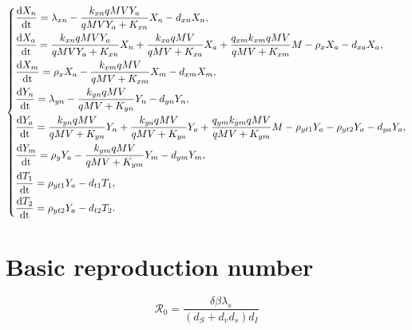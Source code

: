 \documentclass[preprint,11pt,sort&compress,square]{elsarticle}
\numberwithin{equation}{section}
\begin{document}
\begin{equation}\label{cellularimmunity}
	\left\{
	\begin{aligned}
		 & \frac{{\rm d } X_{n}}{{\rm dt}}=\lambda_{xn}-\frac{k_{xn}qMVY_{a}}{qMVY_{a}+K_{xn}}X_{n}-d_{xn}X_{n},                                                                                       \\
		 & \frac{{\rm d } X_{a}}{{\rm dt}}=\frac{k_{xn}qMVY_{a}}{qMVY_{a}+K_{xn}}X_{n}+\frac{k_{xa}qMV}{qMV+K_{xa}}X_{a}+\frac{q_{xm}k_{xm}qMV}{qMV+K_{xm}}M-\rho_{x}X_{a}-d_{xa}X_{a},                    \\
		 & \frac{{\rm d } X_{m}}{{\rm dt}}=\rho_{x} X_{a}-\frac{k_{xm}qMV}{qMV+K_{xm}}X_{m}-d_{xm}X_{m},                                                       \\
		 & \frac{{\rm d } Y_{n}}{{\rm dt}}=\lambda_{yn}-\frac{k_{yn}qMV}{qMV+K_{yn}}Y_{n}-d_{yn}Y_{n},                                                                                       \\
		 & \frac{{\rm d } Y_{a}}{{\rm dt}}=\frac{k_{yn}qMV}{qMV+K_{yn}}Y_{n}+\frac{k_{ya}qMV}{qMV+K_{ya}}Y_{a}+\frac{q_{ym}k_{ym}qMV}{qMV+K_{ym}}M-\rho_{yt1}Y_{a}-\rho_{yt2}Y_{a}-d_{ya}Y_{a}, \\
		 & \frac{{\rm d } Y_{m}}{{\rm dt}}=\rho_{y} Y_{a}-\frac{k_{ym}qMV}{qMV+K_{ym}}Y_{m}-d_{ym}Y_{m},                                                       \\
		 & \frac{{\rm d } T_{1}}{{\rm dt}}=\rho_{yt1}Y_{a}-d_{t1}T_{1},                                                                                                                \\
		 & \frac{{\rm d } T_{2}}{{\rm dt}}=\rho_{yt2}Y_{a}-d_{t2}T_{2}.                                                                                                                    \\
	\end{aligned}
	\right.
\end{equation}

\section{Basic reproduction number}

$$\mathcal{R}_{0}=\frac{\delta\beta\lambda_{s}}{(d_{S}+d_{v}d_{s})d_{I}}$$

\bigskip
{}





\end{document}
